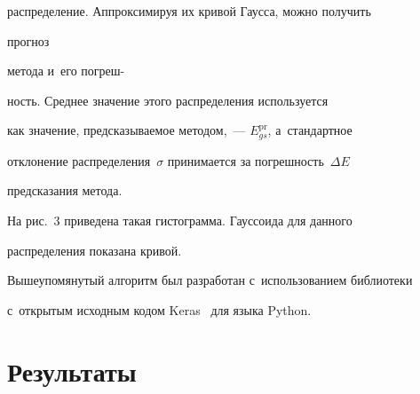 распределение. Аппроксимируя их кривой Гаусса, мож\-но получить\hspace*{74.5mm}\linebreak


 прогноз 


метода и~его по\-греш-\hspace*{74.5mm}\linebreak


ность. Среднее значение этого распределения используется 


как значение, пред\-ска\-зы\-ва\-емое методом,~--- $E_{gs}^{\mathrm{pr}}$, а~стан\-дарт\-ное 


отклонение распределения~$\sigma$ принимается за по\-греш\-ность~$\Delta E$ 


пред\-ска\-за\-ния метода.




  На рис.~3 приведена такая гис\-то\-грам\-ма. Гаус\-со\-и\-да для данного 


распределения показана кривой. 








  





  


  





  Вышеупомянутый алгоритм был разработан с~использованием биб\-лио\-те\-ки 


с~открытым исходным кодом Keras~\cite{15-b} для языка Python. 





\vspace*{-2pt}


  


\section{Результаты}





\vspace*{-2pt}





